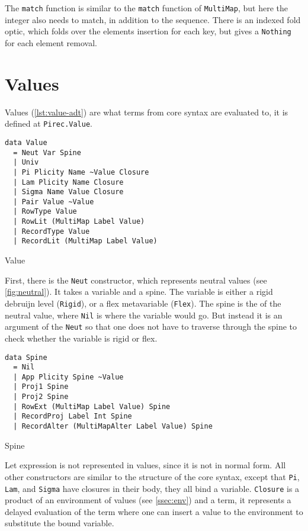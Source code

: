 The \texttt{match} function is similar to the \texttt{match}
function of \texttt{MultiMap}, but here the integer also needs to match,
in addition to the sequence. There is an indexed fold optic, which folds over
the elements insertion for each key, but gives a \texttt{Nothing} for
each element removal.

\section{Values}\label{sec:value}

Values (\cref{lst:value-adt}) are what terms from core syntax are evaluated to,
it is defined at \texttt{Pirec.Value}.

\begin{listing}
  \begin{verbatim}
data Value
  = Neut Var Spine
  | Univ
  | Pi Plicity Name ~Value Closure
  | Lam Plicity Name Closure
  | Sigma Name Value Closure
  | Pair Value ~Value
  | RowType Value
  | RowLit (MultiMap Label Value)
  | RecordType Value
  | RecordLit (MultiMap Label Value)
  \end{verbatim}
  \caption{Value }\label{lst:value-adt}
\end{listing}

First, there is the \texttt{Neut} constructor, which represents neutral
values (see \cref{fig:neutral}). It takes a variable and a spine. The variable
is either a rigid debruijn level (\texttt{Rigid}), or a flex
metavariable (\texttt{Flex}). The spine is the  of the neutral
value, where \texttt{Nil} is where the variable would go. But instead it
is an argument of the \texttt{Neut} so that one does not have to
traverse through the spine to check whether the variable is rigid or flex.

\begin{listing}
  \begin{verbatim}
data Spine
  = Nil
  | App Plicity Spine ~Value
  | Proj1 Spine
  | Proj2 Spine
  | RowExt (MultiMap Label Value) Spine
  | RecordProj Label Int Spine
  | RecordAlter (MultiMapAlter Label Value) Spine
  \end{verbatim}
  \caption{Spine }\label{lst:spine-adt}
\end{listing}

Let expression is not represented in values, since it is not in normal form. All
other constructors are similar to the structure of the core syntax, except that
\texttt{Pi}, \texttt{Lam}, and \texttt{Sigma} have
closures in their body, they all bind a variable. \texttt{Closure} is a
product of an environment of values (see \cref{ssec:env}) and a term, it
represents a delayed evaluation of the term where one can insert a value to the
environment to substitute the bound variable.

